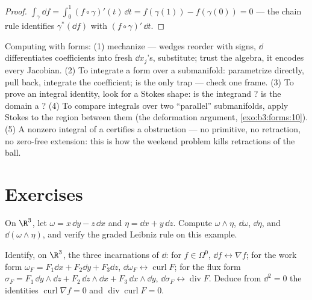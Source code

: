 \begin{proof}
$\int_\gamma\dd f = \int_0^1(f\circ\gamma)'(t)\,\dd t =
f(\gamma(1)) - f(\gamma(0)) = 0$ --- the chain rule
identifies $\gamma^*(\dd f)$ with $(f\circ\gamma)'\,\dd t$.
\end{proof}

\begin{method}\label{met:b3:forms:method}
Computing with forms: (1) mechanize --- wedges reorder with
signs, $\dd$ differentiates coefficients into fresh $\dd
x_j$'s,  substitute; trust the algebra, it encodes
every Jacobian. (2) To integrate a form over a submanifold:
parametrize directly, pull back, integrate the coefficient;
 is the only trap --- check one frame. (3) To
prove an integral identity, look for a Stokes shape: is the
integrand ? is the domain a ? (4) To compare
integrals over two ``parallel'' submanifolds, apply Stokes
to the region between them (the deformation argument,
\cref{exo:b3:forms:10}). (5) A nonzero integral of a  certifies a  obstruction --- no primitive,
no retraction, no zero-free extension: this is how the
weekend problem kills retractions of the ball.
\end{method}

\section{Exercises}

\begin{exercise}[$\star$]\label{exo:b3:forms:1}
On $\R^3$, let $\omega = x\,\dd y - z\,\dd x$ and $\eta =
\dd x + y\,\dd z$. Compute $\omega\wedge\eta$, $\dd\omega$,
$\dd\eta$, and $\dd(\omega\wedge\eta)$, and verify the
graded Leibniz rule on this example.
\end{exercise}

\begin{exercise}[$\star$]\label{exo:b3:forms:2}
Identify, on $\R^3$, the three incarnations of $\dd$: for
$f \in \Omega^0$, $\dd f \leftrightarrow \nabla f$; for the
work form $\omega_F = F_1\dd x + F_2\dd y + F_3\dd z$,
$\dd\omega_F \leftrightarrow \operatorname{curl}F$; for the
flux form $\sigma_F = F_1\,\dd y\wedge\dd z + F_2\,\dd
z\wedge\dd x + F_3\,\dd x\wedge\dd y$, $\dd\sigma_F
\leftrightarrow \operatorname{div}F$. Deduce from $\dd^2 =
0$ the identities $\operatorname{curl}\nabla f = 0$ and
$\operatorname{div}\operatorname{curl}F = 0$.
\end{exercise}

